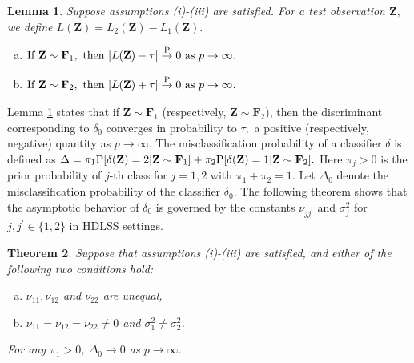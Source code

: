 \documentclass[twoside]{article}
\newcommand{\bZ}{\mathbf{Z}}
\newcommand{\bF}{\mathbf{F}}
\newcommand{\bU}{\mathbf{U}}
\newcommand{\bV}{\mathbf{V}}
\newcommand{\0}{\mathbf{0}}
\newcommand{\1}{\mathbf{1}}
\numberwithin{equation}{section}
\newtheorem{thm}{Theorem}[section]
\newtheorem{lemma}[thm]{Lemma}
\begin{document}
\begin{lemma}\label{tau0def}
Suppose assumptions {\rm (i)-(iii)} are satisfied. For a test observation $\bZ,$ we define $L(\bZ) =L_2(\bZ) - L_1(\bZ).$
\begin{enumerate}[(a)]
\item  $\begin{aligned}[t]&\text{If }\bZ\sim\bF_1,\text{ then }
|L(\bZ) - {\tau}|\stackrel{\rm P}{\to}0\text{ as } p\to\infty .
 \end{aligned}$
\item  $\begin{aligned}[t]&\text{If }\bZ\sim\bF_2,\text{ then }
 |L(\bZ) + {\tau}|\stackrel{\rm P}{\to}0\text{ as } p\to\infty.
 \end{aligned}$
\end{enumerate}
\end{lemma}
Lemma \ref{tau0def} states that if $\bZ\sim\bF_1$ (respectively, $\bZ\sim\bF_2$), then the discriminant corresponding to $\delta_0$ converges in probability to $\tau,$ a positive (respectively, negative) quantity as $p\to\infty$. The misclassification probability of a classifier $\delta$ is defined as $\Delta=\pi_1{\rm P}[\delta(\bZ)=2|\bZ\sim\bF_1]+\pi_2{\rm P}[\delta(\bZ)=1|\bZ\sim\bF_2].$ Here $\pi_j>0$ is the prior probability of $j$-th class for $j=1,2$ with $\pi_1+\pi_2=1.$ %
Let $\Delta_0$ denote the misclassification probability of the classifier $\delta_0.$ The following theorem shows that the asymptotic behavior of $\delta_0$ is governed by the constants $\nu_{jj^\prime}$ and $ \sigma^2_j$ for $j,j^\prime\in\{1,2\}$ in HDLSS settings.
\begin{thm}\label{theorem0}
Suppose that assumptions {\rm (i)-(iii)} are satisfied, and either of the following two conditions hold:
\begin{enumerate}[(a)]
\vspace{-0.35cm}
 \item $\nu_{11}, \nu_{12}$ and $\nu_{22}$ are unequal, %
 \vspace{-0.25cm}
\item $\nu_{11}= \nu_{12} = \nu_{22}\neq 0$ and $\sigma_1^2 \neq \sigma_2^2$.
\vspace{-0.35cm}
\end{enumerate}
For any $\pi_1>0$, $\Delta_0\to 0$ as $p\to\infty $.
\end{thm}
\end{document}
